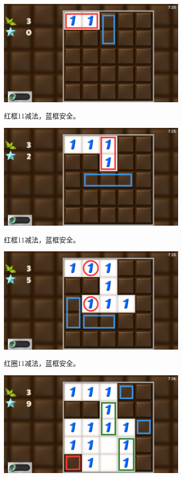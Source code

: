 \subsection{} %
\begin{center}
    \includegraphics[width=0.7\textwidth]{puzzle/5-1.png}
\end{center}
红框11减法，蓝框安全。
\begin{center}
    \includegraphics[width=0.7\textwidth]{puzzle/5-2.png}
\end{center}
红框11减法，蓝框安全。
\begin{center}
    \includegraphics[width=0.7\textwidth]{puzzle/5-3.png}
\end{center}
红圈11减法，蓝框安全。
\begin{center}
    \includegraphics[width=0.7\textwidth]{puzzle/5-4.png}
\end{center}
